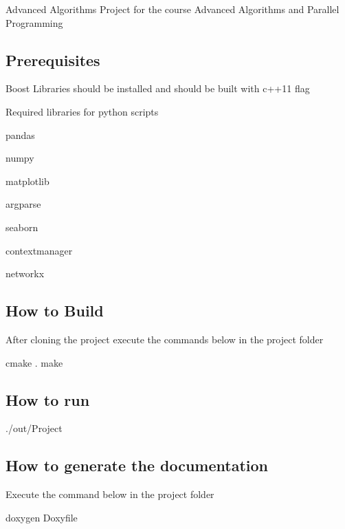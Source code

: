 Advanced Algorithms Project for the course Advanced Algorithms and Parallel Programming

\subsection*{Prerequisites}


\begin{DoxyItemize}
\item Boost Libraries should be installed and should be built with c++11 flag
\item Required libraries for python scripts
\begin{DoxyItemize}
\item pandas
\item numpy
\item matplotlib
\item argparse
\item seaborn
\item contextmanager
\item networkx
\end{DoxyItemize}
\end{DoxyItemize}

\subsection*{How to Build}

After cloning the project execute the commands below in the project folder


\begin{DoxyCode}
cmake .
make
\end{DoxyCode}


\subsection*{How to run}


\begin{DoxyCode}
./out/Project 
\end{DoxyCode}
 \subsection*{How to generate the documentation}

Execute the command below in the project folder


\begin{DoxyCode}
doxygen Doxyfile
\end{DoxyCode}
 